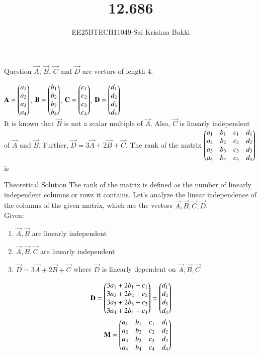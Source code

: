 \documentclass{beamer}
\title %
{12.686}
\author 
{EE25BTECH11049-Sai Krishna Bakki}
\begin{document}
\frame{\titlepage}
\begin{frame}{Question}
 $\vec{A}$, $\vec{B}$, $\vec{C}$ and $\vec{D}$ are vectors of length 4.

 $\mathbf{A} = \begin{pmatrix} a_1 \\ a_2 \\ a_3 \\ a_4 \end{pmatrix}$,
$\mathbf{B} = \begin{pmatrix}b_1 \\ b_2 \\ b_3 \\ b_4\end{pmatrix}$,
$\mathbf{C} = \begin{pmatrix} c_1 \\ c_2 \\ c_3 \\ c_4 \end{pmatrix}$,
$\mathbf{D} = \begin{pmatrix}d_1 \\ d_2 \\ d_3 \\ d_4 \end{pmatrix}$\\

It is known that $\vec{B}$ is not a scalar multiple of $\vec{A}$. Also, $\vec{C}$ is linearly independent of $\vec{A}$ and $\vec{B}$. Further, $\vec{D} = 3\vec{A} + 2\vec{B} + \vec{C}$. The rank of the matrix
$
\begin{pmatrix}
a_1 & b_1 & c_1 & d_1 \\
a_2 & b_2 & c_2 & d_2 \\
a_3 & b_3 & c_3 & d_3 \\
a_4 & b_4 & c_4 & d_4
\end{pmatrix}
$
is
\end{frame}
\begin{frame}{Theoretical Solution}
    The rank of the matrix is defined as the number of linearly independent columns or rows it contains. Let's analyze the linear independence of the columns of the given matrix, which are the vectors $\vec{A},\vec{B},\vec{C},\vec{D}$.\\
Given:
\begin{enumerate}
    \item $\vec{A},\vec{B}$ are linearly independent
    \item $\vec{A},\vec{B},\vec{C}$ are linearly independent
    \item $\vec{D}=3\vec{A}+2\vec{B}+\vec{C}$ where $\vec{D}$ is linearly dependent on $\vec{A},\vec{B},\vec{C}$
\end{enumerate}
\begin{align}
   \mathbf{D}=\begin{pmatrix}3a_1+2b_1+c_1\\3a_2+2b_2+c_2\\3a_3+2b_3+c_3\\3a_4+2b_4+c_4\end{pmatrix}=\begin{pmatrix}d_1\\d_2\\d_3\\d_4\end{pmatrix}\\
    \mathbf{M}=\begin{pmatrix}a_1 & b_1 & c_1 & d_1 \\
a_2 & b_2 & c_2 & d_2 \\
a_3 & b_3 & c_3 & d_3 \\
a_4 & b_4 & c_4 & d_4\end{pmatrix}\\
\end{align}
\end{frame}
\end{document}
